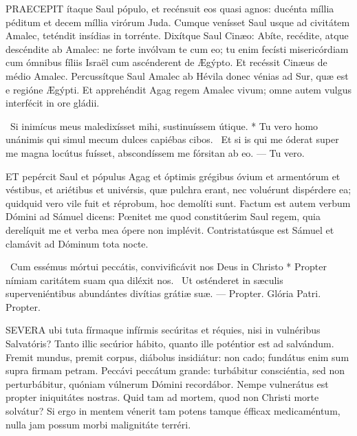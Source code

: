 \lettrine[lines=2]{P}{RAECEPIT} ítaque Saul pópulo, et recénsuit eos quasi agnos: ducénta míllia péditum et decem míllia virórum Juda. Cumque venísset Saul usque ad civitátem Amalec, teténdit insídias in torrénte. Dixítque Saul Cinæo: Abíte, recédite, atque descéndite ab Amalec: ne forte invólvam te cum eo; tu enim fecísti misericórdiam cum ómnibus fíliis Israël cum ascénderent de Ægýpto. Et recéssit Cinæus de médio Amalec. Percussítque Saul Amalec ab Hévila donec vénias ad Sur, quæ est e regióne Ægýpti. Et apprehéndit Agag regem Amalec vivum; omne autem vulgus interfécit in ore gládii.

\R\ Si inimícus meus maledixísset mihi, sustinuíssem útique. * Tu vero homo unánimis qui simul mecum dulces capiébas cibos. \V\ Et si is qui me óderat super me magna locútus fuísset, abscondíssem me fórsitan ab eo. --- Tu vero.


\lettrine[lines=2]{E}{T} pepércit Saul et pópulus Agag et óptimis grégibus óvium et armentórum et véstibus, et ariétibus et univérsis, quæ pulchra erant, nec voluérunt dispérdere ea; quidquid vero vile fuit et réprobum, hoc demolíti sunt. Factum est autem verbum Dómini ad Sámuel dicens: Pœnitet me quod constitúerim Saul regem, quia derelíquit me et verba mea ópere non implévit. Contristatúsque est Sámuel et clamávit ad Dóminum tota nocte.

\R\ Cum essémus mórtui peccátis, convivificávit nos Deus in Christo * Propter nímiam caritátem suam qua diléxit nos. \V\ Ut osténderet in sæculis superveniéntibus abundántes divítias grátiæ suæ. --- Propter. Glória Patri. Propter.





\lettrine[lines=2]{S}{EVERA} ubi tuta fírmaque infírmis secúritas et réquies, nisi in vulnéribus Salvatóris? Tanto illic secúrior hábito, quanto ille poténtior est ad salvándum. Fremit mundus, premit corpus, diábolus insidiátur: non cado; fundátus enim sum supra firmam petram. Peccávi peccátum grande: turbábitur consciéntia, sed non perturbábitur, quóniam vúlnerum Dómini recordábor. Nempe vulnerátus est propter iniquitátes nostras. Quid tam ad mortem, quod non Christi morte solvátur? Si ergo in mentem vénerit tam potens tamque éfficax medicaméntum, nulla jam possum morbi malignitáte terréri.

